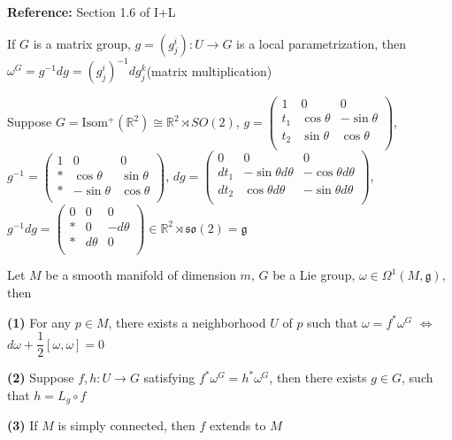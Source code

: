\documentclass[../main.tex]{subfiles}
\begin{document}
\textbf{Reference: }Section 1.6 of I+L

\begin{lemma}
If $G$ is a matrix group, $g=(g^i_j):U\to G$ is a local parametrization, then $\omega^G=g^{-1}dg=(g^i_j)^{-1}dg^k_j$(matrix multiplication)
\end{lemma}

\begin{example}
Suppose $G=\mathrm{Isom^+}(\mathbb R^2)\cong\mathbb R^2\rtimes SO(2)$, $g=\begin{pmatrix}
1&0&0 \\
t_1 & \cos\theta &-\sin\theta \\
t_2 & \sin\theta &\cos\theta \\
\end{pmatrix}$, $g^{-1}=\begin{pmatrix}
1&0&0 \\
* & \cos\theta &\sin\theta \\
* & -\sin\theta &\cos\theta \\
\end{pmatrix}$, $dg=\begin{pmatrix}
0&0&0 \\
dt_1 &-\sin\theta d\theta &-\cos\theta d\theta \\
dt_2 & \cos\theta d\theta&-\sin\theta d\theta \\
\end{pmatrix}$, $g^{-1}dg=\begin{pmatrix}
0&0&0 \\
* & 0&-d\theta \\
* & d\theta &0 \\
\end{pmatrix}\in\mathbb R^2\rtimes \mathfrak{so}(2)=\mathfrak g$
\end{example}

\begin{theorem}
Let $M$ be a smooth manifold of dimension $m$, $G$ be a Lie group, $\omega\in\Omega^1(M,\mathfrak g)$, then \par
\textbf{(1) }For any $p\in M$, there exists a neighborhood $U$ of $p$ such that $\omega=f^*\omega^G$ $\Leftrightarrow$ $d\omega+\dfrac{1}{2}[\omega,\omega]=0$ \par
\textbf{(2) }Suppose $f,h:U\to G$ satisfying $f^*\omega^G=h^*\omega^G$, then there exists $g\in G$, such that $h=L_g\circ f$ \par
\textbf{(3) }If $M$ is simply connected, then $f$ extends to $M$
\end{theorem}
\end{document}
